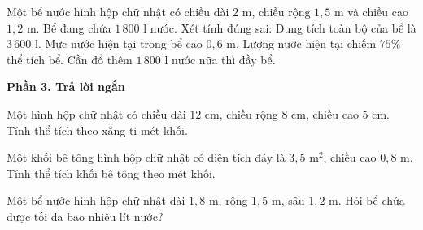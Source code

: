 \begin{ex} %
Một bể nước hình hộp chữ nhật có chiều dài $2\text{ m}$, chiều rộng $1{,}5\text{ m}$ và chiều cao $1{,}2\text{ m}$. Bể đang chứa $1\,800\text{ l}$ nước. Xét tính đúng sai:
\choiceTF
{\True Dung tích toàn bộ của bể là $3\,600\text{ l}$.}
{\True Mực nước hiện tại trong bể cao $0{,}6\text{ m}$.}
{Lượng nước hiện tại chiếm $75\%$ thể tích bể.}
{\True Cần đổ thêm $1\,800\text{ l}$ nước nữa thì đầy bể.}
\end{ex}

\textbf{Phần 3. Trả lời ngắn}

\begin{ex} %
Một hình hộp chữ nhật có chiều dài $12\text{ cm}$, chiều rộng $8\text{ cm}$, chiều cao $5\text{ cm}$. Tính thể tích theo xăng-ti-mét khối.
\end{ex}

\begin{ex} %
Một khối bê tông hình hộp chữ nhật có diện tích đáy là $3{,}5\text{ m}^2$, chiều cao $0{,}8\text{ m}$. Tính thể tích khối bê tông theo mét khối.
\end{ex}

\begin{ex} %
Một bể nước hình hộp chữ nhật dài $1{,}8\text{ m}$, rộng $1{,}5\text{ m}$, sâu $1{,}2\text{ m}$. Hỏi bể chứa được tối đa bao nhiêu lít nước?
\end{ex}


